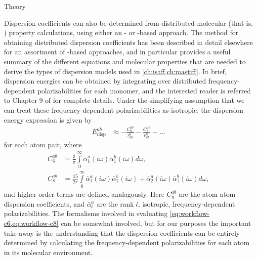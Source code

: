 \begin{subsubsection}{Theory}

Dispersion coefficients can also be determined from distributed molecular
(that is, \aim)
property calculations, using either an \isa- or \dma-based approach. The method
for obtaining distributed dispersion coefficients has been described in detail elsewhere for an assortment of \dma-based
approaches,
\cite{Williams2003,Misquitta2008,McDaniel2012,McDaniel2013,stone2013theory,McDaniel2014a}
and  in particular provides a useful summary of the
different equations and molecular properties that are needed to derive
the types of dispersion models used in \cref{ch:isaff,ch:mastiff}.
In brief, \aim dispersion energies can be obtained by integrating over
distributed 
frequency-dependent polarizabilities for each monomer, and the interested
reader is referred to Chapter 9 of  for complete
details.
Under the simplifying assumption that we can treat these frequency-dependent polarizabilities as
isotropic,
the dispersion energy expression is given by
\begin{align}
\label{eq:workflow-edisp}
E^{ab}_{\text{disp}} &\approx - \frac{C^{ab}_6}{r_{ab}^6} - \frac{C^{ab}_8}{r_{ab}^8} - \ldots
\end{align}
for each atom pair, where 
\begin{align}
\label{eq:workflow-c6}
C^{ab}_6 &= \frac{3}{\pi} \int\limits_{0}^{\infty} \bar{\alpha}^a_{1}
(i\omega) \bar{\alpha}^b_{1} (i\omega) d\omega , \\
%
C^{ab}_8 &= \frac{15}{2\pi} \int\limits_{0}^{\infty} 
\bar{\alpha}^a_{1} (i\omega) \bar{\alpha}^b_{2} (i\omega) 
+ \bar{\alpha}^a_{2} (i\omega) \bar{\alpha}^b_{1} (i\omega) 
d\omega , 
\label{eq:workflow-c8}
\end{align}
and higher order terms are defined analagously. Here $C^{ab}_n$ are the
atom-atom dispersion coefficients, and $\bar{\alpha}^a_l$ are the
rank $l$, isotropic, \aim frequency-dependent polarizabilities. 
The formalisms involved in evaluating \cref{eq:workflow-c6,eq:workflow-c8} can be somewhat
involved,
but for our purposes the important take-away is the understanding that the dispersion
coefficients can be entirely determined by calculating the frequency-dependent
polarizabilities for each atom in its molecular environment.


\end{subsubsection}
